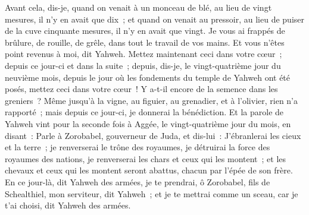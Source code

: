 \begin{multicols}{2}
Avant cela, dis-je, quand on venait à un monceau de blé, au lieu de vingt mesures, il n'y en avait que dix~; et quand on  venait au pressoir, au lieu de puiser de la cuve cinquante mesures, il n'y en avait que vingt.
Je vous ai frappés de brûlure, de rouille, de grêle, dans tout le travail de vos mains. Et vous n'êtes point revenus à moi, dit Yahweh.
Mettez maintenant ceci dans votre cœur~; depuis ce jour-ci et dans la suite~; depuis, dis-je, le vingt-quatrième jour du neuvième mois, depuis le jour où les fondements du temple de Yahweh ont été posés, mettez ceci dans votre cœur~!
Y a-t-il encore de la semence dans les greniers~? Même jusqu'à la vigne, au figuier, au grenadier, et à l'olivier, rien n'a rapporté~; mais depuis ce jour-ci, je donnerai la bénédiction.
Et la parole de Yahweh vint pour la seconde fois à Aggée, le vingt-quatrième jour du mois, en disant~:
Parle à Zorobabel, gouverneur de Juda, et dis-lui~: J'ébranlerai les cieux et la terre~;
je renverserai le trône des royaumes, je détruirai la force des royaumes des nations, je renverserai les chars et ceux qui les montent~; et les chevaux et ceux qui les montent seront abattus, chacun par l'épée de son frère.
En ce jour-là, dit Yahweh des armées, je te prendrai, ô Zorobabel, fils de Schealthiel, mon serviteur, dit Yahweh~; et je te mettrai comme un sceau, car je t'ai choisi, dit Yahweh des armées.
\PPE{}
\end{multicols}
